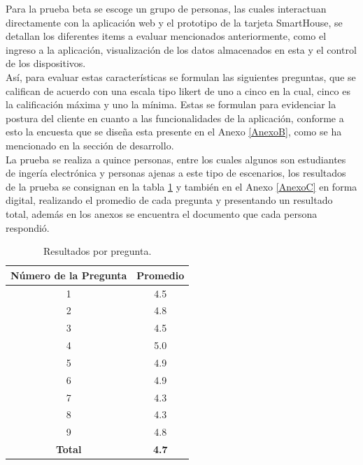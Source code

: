 Para la prueba beta se escoge un grupo de personas, las cuales interactuan directamente con la aplicación web y el prototipo de la tarjeta SmartHouse, se detallan los diferentes items a evaluar mencionados anteriormente, como el ingreso a la aplicación, visualización de los datos almacenados en esta y el control de los dispositivos.\\

Así, para evaluar estas características se formulan las siguientes preguntas, que se califican de acuerdo con una escala tipo likert \cite{lik} de uno a cinco en la cual, cinco es la calificación máxima y uno la mínima. Estas se formulan para evidenciar la postura del cliente en cuanto a las funcionalidades de la aplicación, conforme a esto la encuesta que se diseña esta presente en el Anexo \ref{AnexoB}, como se ha mencionado en la sección de desarrollo.\\

La prueba se realiza a quince personas, entre los cuales algunos son estudiantes de ingería electrónica y personas ajenas a este tipo de escenarios, los resultados de la prueba se consignan en la tabla \ref{table:enc} y también en el Anexo \ref{AnexoC} en forma digital, realizando el promedio de cada pregunta y presentando un resultado total, además en los anexos se encuentra el documento que cada persona respondió.\\

\begin{table}[H]
	\begin{center}
		\caption{Resultados por pregunta.}
		\label{table:enc}
		\begin{tabular}{|c|c|}
			\hline 
			\textbf{Número de la Pregunta} & \textbf{Promedio} \\ 
			\hline 
			1 & 4.5\\ 
			\hline 
			2 & 4.8\\ 
			\hline 
			3 & 4.5\\ 
			\hline 
			4 & 5.0\\ 
			\hline 
			5 & 4.9\\ 
			\hline 
			6 & 4.9\\ 
			\hline 
			7 & 4.3\\ 
			\hline 
			8 & 4.3\\ 
			\hline 
			9 & 4.8\\ 
			\hline 
			\textbf{Total} & \textbf{4.7}\\ 
			\hline 
		\end{tabular} 
	\end{center}
\end{table}

